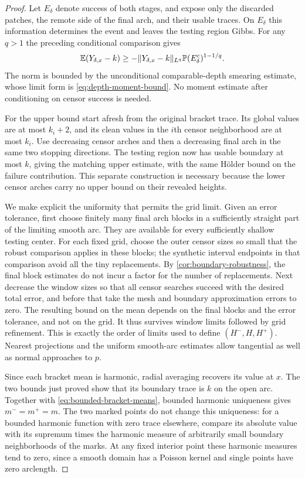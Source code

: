 \begin{proof}
Let $E_\delta$ denote success of both stages, and expose only the
discarded patches, the remote side of the final arch, and their
usable traces. On $E_\delta$ this information determines the event
and leaves the testing region Gibbs. For any $q>1$ the preceding
conditional comparison gives
\begin{equation}
 \mathbb E(Y_{\delta,x}-k)\ge
       -\lVert Y_{\delta,x}-k\rVert_{L^q}
                           \mathbb P(E_\delta^c)^{1-1/q}.
 \label{eq:boundary-mean-error}
\end{equation}
The norm is bounded by the unconditional comparable-depth smearing
estimate, whose limit form is \eqref{eq:depth-moment-bound}. No
moment estimate after conditioning on censor success is needed.

For the upper bound start afresh from the original bracket trace.
Its global values are at most $k_i+2$, and its clean values in the
$i$th censor neighborhood are at most $k_i$. Use decreasing censor
arches and then a decreasing final arch in the same two stopping
directions. The testing region now has usable boundary at most $k$,
giving the matching upper estimate, with the same H\"older bound on
the failure contribution. This separate
construction is necessary because the lower censor arches carry no
upper bound on their revealed heights.

We make explicit the uniformity that permits the grid limit. Given an
error tolerance, first choose finitely many final arch blocks in a
sufficiently straight part of the limiting smooth arc. They are
available for every sufficiently shallow testing center. For each
fixed grid, choose the outer censor sizes so small that the robust
comparison applies in these blocks; the synthetic interval endpoints
in that comparison avoid all the tiny replacements. By
\cref{cor:boundary-robustness}, the final block estimates do not incur
a factor for the number of replacements. Next decrease the window
sizes so that all censor searches succeed with the desired total
error, and before that take the mesh and boundary approximation
errors to zero. The resulting bound on the mean depends on the final
blocks and the error tolerance, and not on the grid. It thus survives
window limits followed by grid refinement. This is exactly the order
of limits used to define $(H^-,H,H^+)$. Nearest projections and the
uniform smooth-arc estimates allow tangential as well as normal
approaches to $p$.

Since each bracket mean is harmonic, radial averaging recovers its
value at $x$. The two bounds just proved show that its boundary trace
is $k$ on the open arc. Together with
\eqref{eq:bounded-bracket-means}, bounded harmonic uniqueness gives
$m^-=m^+=m$. The two marked points do not change this uniqueness:
for a bounded harmonic function with zero trace elsewhere, compare
its absolute value with its supremum times the harmonic measure of
arbitrarily small boundary neighborhoods of the marks. At any fixed
interior point these harmonic measures tend to zero, since a smooth
domain has a Poisson kernel and single points have zero arclength.


\end{proof}
